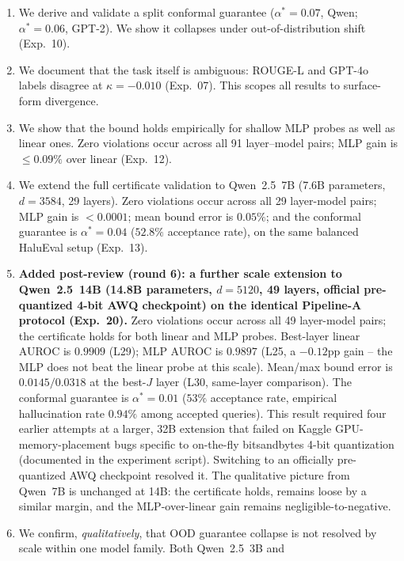 \documentclass[onecolumn]{jmlr}
\begin{document}
\begin{enumerate}[leftmargin=*, topsep=2pt, itemsep=1pt]
    GPT-2. This establishes architecture-dependent certificate selection
    (Exp.~08).
  \item We derive and validate a split conformal guarantee
    ($\alpha^* = 0.07$, Qwen; $\alpha^* = 0.06$, GPT-2). We show it
    collapses under out-of-distribution shift (Exp.~10).
  \item We document that the task itself is ambiguous: ROUGE-L and
    GPT-4o labels disagree at $\kappa = -0.010$ (Exp.~07). This scopes
    all results to surface-form divergence.
  \item We show that the bound holds empirically for shallow MLP probes
    as well as linear ones. Zero violations occur across all 91
    layer--model pairs; MLP gain is $\leq 0.09\%$ over linear (Exp.~12).
  \item We extend the full certificate validation to Qwen~2.5~7B (7.6B
    parameters, $d=3584$, 29 layers). Zero violations occur across all
    29 layer-model pairs; MLP gain is $< 0.0001$; mean bound error is
    $0.05\%$; and the conformal guarantee is $\alpha^* = 0.04$ ($52.8\%$
    acceptance rate), on the same balanced HaluEval setup (Exp.~13).
  \item \textbf{Added post-review (round 6): a further scale extension to
    Qwen~2.5~14B (14.8B parameters, $d=5120$, 49 layers, official
    pre-quantized 4-bit AWQ checkpoint) on the identical Pipeline-A
    protocol (Exp.~20).} Zero violations occur across all 49 layer-model
    pairs; the certificate holds for both linear and MLP probes.
    Best-layer linear AUROC is $0.9909$ (L29); MLP AUROC is $0.9897$
    (L25, a $-0.12$pp gain -- the MLP does not beat the linear probe at
    this scale). Mean/max bound error is $0.0145/0.0318$ at the best-$J$
    layer (L30, same-layer comparison). The conformal guarantee is
    $\alpha^*=0.01$ ($53\%$ acceptance rate, empirical hallucination rate
    $0.94\%$ among accepted queries). This result required four earlier
    attempts at a larger, 32B extension that failed on Kaggle
    GPU-memory-placement bugs specific to on-the-fly bitsandbytes 4-bit
    quantization (documented in the experiment script). Switching to an
    officially pre-quantized AWQ checkpoint resolved it. The qualitative
    picture from Qwen~7B is unchanged at 14B: the certificate holds,
    remains loose by a similar margin, and the MLP-over-linear gain
    remains negligible-to-negative.
  \item We confirm, \emph{qualitatively}, that OOD guarantee collapse is
    not resolved by scale within one model family. Both Qwen~2.5~3B and

\end{enumerate}
\end{document}
